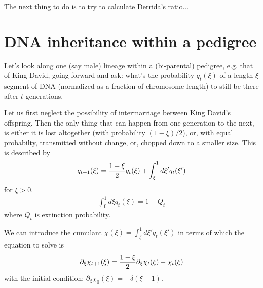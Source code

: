 \documentclass{article}
\begin{document}
The next thing to do is to try to calculate Derrida's ratio...

\section*{DNA inheritance within a pedigree}
Let's look along one (say male) lineage within a (bi-parental) pedigree, e.g. that of King David, going forward and ask: what's the probability $q_t(\xi)$ of a length $\xi$ segment of DNA (normalized as a fraction of chromosome length) to still be there after $t$ generations. 

Let us first neglect the possibility of intermarriage between King David's offspring. Then the only thing that can happen from one generation to the next, is either it is lost altogether (with probability $(1-\xi)/2$), or, with equal probabilty, transmitted without change, or, chopped down to a smaller size. This is described by
\begin{eqnarray}
q_{t+1}(\xi)={1-\xi \over 2}q_{t}(\xi)+\int_{\xi}^1 d\xi ' q_{t}(\xi ')
\end{eqnarray}
for $\xi >0$.
\begin{eqnarray}
\int_0^1 d{\xi}q_{t}(\xi)=1-Q_{t}
\end{eqnarray}
where $Q_t$ is extinction probability.

We can introduce the cumulant $\chi( \xi )=\int_{\xi}^1 d\xi ' q_{t}(\xi ')$ in terms of which the equation to solve is
\begin{eqnarray}
\partial_{\xi} \chi_{t+1}(\xi)={1-\xi \over 2}\partial_{\xi} \chi_{t}(\xi)-\chi_{t}(\xi )
\end{eqnarray}
with the initial condition: $\partial_{\xi} \chi_0(\xi)=-\delta (\xi-1)$. 
\end{document}
